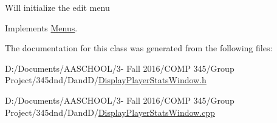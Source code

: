 Will initialize the edit menu 

Implements \hyperlink{class_menus}{Menus}.



The documentation for this class was generated from the following files\+:\begin{DoxyCompactItemize}
\item 
D\+:/\+Documents/\+A\+A\+S\+C\+H\+O\+O\+L/3-\/ Fall 2016/\+C\+O\+M\+P 345/\+Group Project/345dnd/\+Dand\+D/\hyperlink{_display_player_stats_window_8h}{Display\+Player\+Stats\+Window.\+h}\item 
D\+:/\+Documents/\+A\+A\+S\+C\+H\+O\+O\+L/3-\/ Fall 2016/\+C\+O\+M\+P 345/\+Group Project/345dnd/\+Dand\+D/\hyperlink{_display_player_stats_window_8cpp}{Display\+Player\+Stats\+Window.\+cpp}\end{DoxyCompactItemize}
